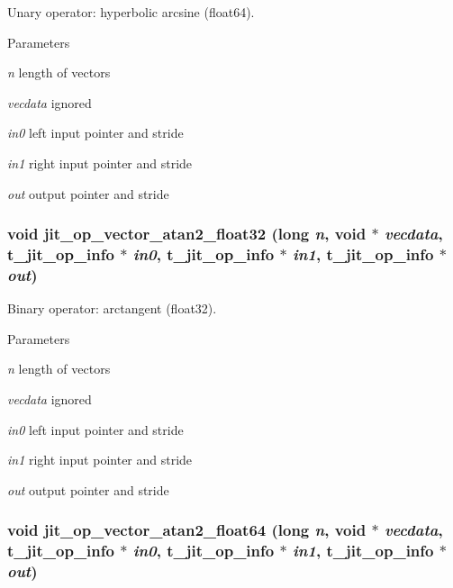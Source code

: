 Unary operator: hyperbolic arcsine (float64). 
\begin{DoxyParams}{Parameters}
\item[{\em n}]length of vectors \item[{\em vecdata}]ignored \item[{\em in0}]left input pointer and stride \item[{\em in1}]right input pointer and stride \item[{\em out}]output pointer and stride \end{DoxyParams}
\hypertarget{group__opvecmod_ga2dfff20e34210f289f81daa3659e9e01}{
\subsubsection[{jit\_\-op\_\-vector\_\-atan2\_\-float32}]{\setlength{\rightskip}{0pt plus 5cm}void jit\_\-op\_\-vector\_\-atan2\_\-float32 (long {\em n}, \/  void $\ast$ {\em vecdata}, \/  {\bf t\_\-jit\_\-op\_\-info} $\ast$ {\em in0}, \/  {\bf t\_\-jit\_\-op\_\-info} $\ast$ {\em in1}, \/  {\bf t\_\-jit\_\-op\_\-info} $\ast$ {\em out})}}
\label{group__opvecmod_ga2dfff20e34210f289f81daa3659e9e01}


Binary operator: arctangent (float32). 
\begin{DoxyParams}{Parameters}
\item[{\em n}]length of vectors \item[{\em vecdata}]ignored \item[{\em in0}]left input pointer and stride \item[{\em in1}]right input pointer and stride \item[{\em out}]output pointer and stride \end{DoxyParams}
\hypertarget{group__opvecmod_gaf9a440ed08661ff416fa1339e333b468}{
\subsubsection[{jit\_\-op\_\-vector\_\-atan2\_\-float64}]{\setlength{\rightskip}{0pt plus 5cm}void jit\_\-op\_\-vector\_\-atan2\_\-float64 (long {\em n}, \/  void $\ast$ {\em vecdata}, \/  {\bf t\_\-jit\_\-op\_\-info} $\ast$ {\em in0}, \/  {\bf t\_\-jit\_\-op\_\-info} $\ast$ {\em in1}, \/  {\bf t\_\-jit\_\-op\_\-info} $\ast$ {\em out})}}
\label{group__opvecmod_gaf9a440ed08661ff416fa1339e333b468}


